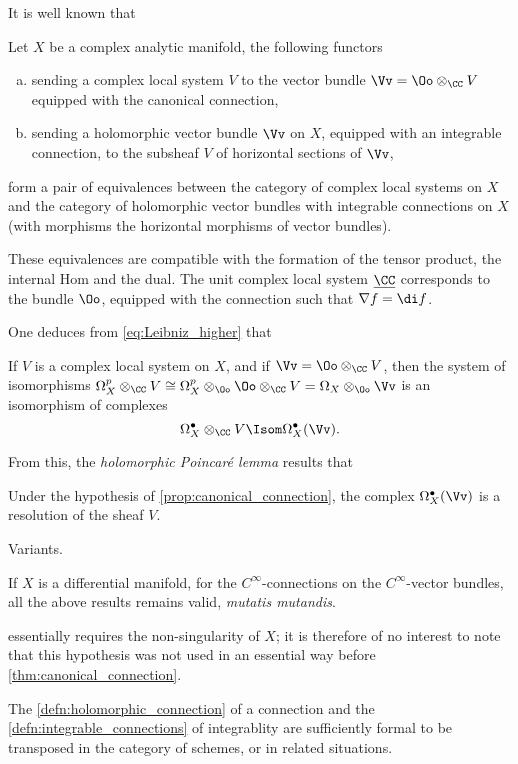 It is well known that
\begin{theorem}\label{thm:canonical_connection}
  Let $X$ be a complex analytic manifold, the following functors
  \begin{enumerate}[a)]
    \item sending a complex local system $V$ to the vector bundle
    $\Vv=\Oo\otimes_\CC V$ equipped with the canonical connection,
    \item sending a holomorphic vector bundle $\Vv$ on $X$, equipped with an
    integrable connection, to the subsheaf $V$ of horizontal sections of $\Vv$,
  \end{enumerate}
  form a pair of equivalences between
  the category of complex local systems on $X$ and
  the category of holomorphic vector bundles with integrable connections on $X$
  (with morphisms the horizontal morphisms of vector bundles).
\end{theorem}

These equivalences are compatible with the formation of the tensor product, the
internal Hom and the dual. The unit complex local system $\underline{\CC}$
corresponds to the bundle $\Oo$, equipped with the connection such that
$\nabla f = \di f$.

One deduces from \cref{eq:Leibniz_higher} that
\begin{proposition}\label{prop:Isom_DeRhamComplex}
  If $V$ is a complex local system on $X$, and if $\Vv=\Oo\otimes_\CC V$,
  then the system of isomorphisms $\Omega_X^p\otimes_\CC V \cong
  \Omega_X^p\otimes_\Oo\Oo\otimes_\CC V = \Omega_X\otimes_\Oo\Vv$ is an
  isomorphism of complexes
  \[
  \Omega_X^\bullet\otimes_\CC V \Isom \Omega_X^\bullet(\Vv).
  \]
\end{proposition}

From this, the \emph{holomorphic Poincar\'{e} lemma} results that
\begin{proposition}\label{prop:Poincare_lemma}
  Under the hypothesis of \ref{prop:canonical_connection},
  the complex $\Omega_X^\bullet(\Vv)$ is a resolution of the sheaf $V$.
\end{proposition}

\begin{para}
  Variants.
  \begin{subpara}
    If $X$ is a differential manifold, for the $C^\infty$-connections on the
    $C^\infty$-vector bundles, all the above results remains valid,
    \emph{mutatis mutandis}.
  \end{subpara}
  \begin{subpara}
     essentially requires the non-singularity of
    $X$; it is therefore of no interest to note that this hypothesis was not
    used in an essential way before \ref{thm:canonical_connection}.
  \end{subpara}
  \begin{subpara}
    The \cref{defn:holomorphic_connection} of a connection and
    the \cref{defn:integrable_connections} of integrablity are
    sufficiently formal to be transposed in the category of schemes, or in
    related situations.
  \end{subpara}
\end{para}

